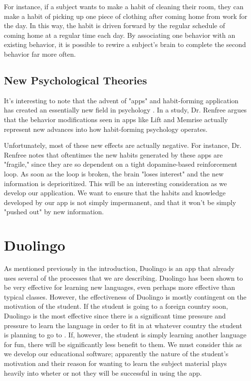 For instance, if a subject wants to make a habit of cleaning their room, they can make a habit of picking up one piece of clothing after coming home from work for the day. In this way, the habit is driven forward by the regular schedule of coming home at a regular time each day. By associating one behavior with an existing behavior, it is possible to rewire a subject's brain to complete the second behavior far more often.

\subsection{New Psychological Theories}
It's interesting to note that the advent of "apps" and habit-forming application has created an essentially new field in psychology \cite{renfree2016don}. In a study, Dr. Renfree argues that the behavior modifications seen in apps like Lift and Memrise actually represent new advances into how habit-forming psychology operates.

Unfortunately, most of these new effects are actually negative. For instance, Dr. Renfree notes that oftentimes the new habits generated by these apps are "fragile," since they are so dependent on a tight dopamine-based reinforcement loop. As soon as the loop is broken, the brain "loses interest" and the new 
information is deprioritized. This will be an interesting consideration as we develop our application. We want to ensure that the habits and knowledge developed by our app is not simply impermanent, and that it won't be simply "pushed out" by new information.




\section{Duolingo}
As mentioned previously in the introduction, Duolingo is an app that already uses several of the processes that we are describing. Duolingo has been shown to be very effective for learning new languages, even perhaps more effective than typical classes. However, the effectiveness of Duolingo is mostly contingent on the motivation of the student. If the student is going to a foreign country soon, Duolingo is the most effective since there is a significant time pressure and pressure to learn the language in order to fit in at whatever country the student is planning to go to \cite{vesselinov2012duolingo}. If, however, the student is simply learning another language for fun, there will be significantly less benefit to them. We must consider this as we develop our educational software; apparently the nature of the student's motivation and their reason for wanting to learn the subject material plays heavily into wheter or not they will be successful in using the app.